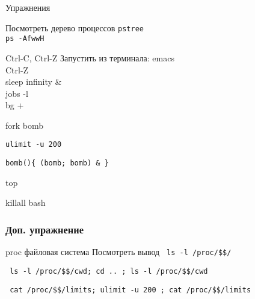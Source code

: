 \begin{frame}{Упражнения}
  \begin{block}{Посмотреть дерево процессов}
    {\tt pstree} \\
    {\tt ps -AfwwH}
  \end{block}
  \pause
  \begin{block}{Ctrl-C, Ctrl-Z}
    Запустить из терминала: emacs \\
    Ctrl-Z \\
    sleep infinity & \\
    jobs -l \\
    bg +
  \end{block}
  \pause
  \begin{block}{fork bomb}

    {\tt ulimit -u 200} 

    {\tt bomb()\{ (bomb; bomb) \& \} }

    top

    killall bash

  \end{block}
\end{frame}

\begin{frame}[fragile]
  \frametitle{Доп. упражнение}
  \begin{block}{proc файловая система}
    Посмотреть вывод \verb+ ls -l /proc/$$/ +

    \verb+ ls -l /proc/$$/cwd; cd .. ; ls -l /proc/$$/cwd +
    
    \verb+ cat /proc/$$/limits; ulimit -u 200 ; cat /proc/$$/limits +

  \end{block}
\end{frame}


